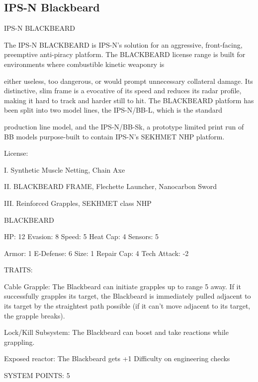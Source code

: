 \subsection{IPS-N Blackbeard}

                                         IPS-N BLACKBEARD 
 

The IPS-N BLACKBEARD is IPS-N’s solution for an aggressive, front-facing, preemptive anti-piracy  
platform. The BLACKBEARD license range is built for environments where combustible kinetic weaponry is  

either useless, too dangerous, or would prompt unnecessary collateral damage. Its distinctive, slim frame is  
a evocative of its speed and reduces its radar profile, making it hard to track and harder still to hit. The  
BLACKBEARD platform has been split into two model lines, the IPS-N/BB-L, which is the standard  

production line model, and the IPS-N/BB-Sk, a prototype limited print run of BB models purpose-built to  
contain IPS-N’s SEKHMET NHP platform. 
 
                                                     License:
 
I. Synthetic Muscle Netting, Chain Axe
 
II. BLACKBEARD FRAME, Flechette Launcher, Nanocarbon Sword
 
III. Reinforced Grapples, SEKHMET class NHP
 

                                                BLACKBEARD 

  HP: 12          Evasion: 8                             Speed: 5            Heat Cap: 4        Sensors: 5 

  Armor: 1        E-Defense: 6                           Size: 1             Repair Cap: 4      Tech Attack: -2 

                                                     TRAITS: 

  Cable Grapple: The Blackbeard can initiate grapples up to range 5 away. If it successfully grapples its  
  target, the Blackbeard is immediately pulled adjacent to its target by the straightest path possible (if it  
  can’t move adjacent to its target, the grapple breaks).
 
  Lock/Kill Subsystem: The Blackbeard can boost and take reactions while grappling.
 
  Exposed reactor: The Blackbeard gets +1 Difficulty on engineering checks 

                                               SYSTEM POINTS: 5 

